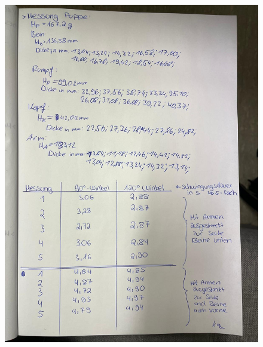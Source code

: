 \begin{figure}
    \centering
    \includegraphics[width=\textwidth]{messdaten_bilder/Daten2.jpg}
\end{figure}